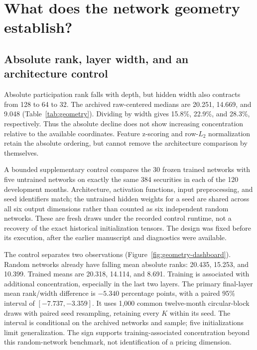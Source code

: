 \section{What does the network geometry establish?}

\subsection{Absolute rank, layer width, and an architecture control}

Absolute participation rank falls with depth, but hidden width also contracts from 128 to 64 to 32. The archived raw-centered medians are 20.251, 14.669, and 9.048 (Table~\ref{tab:geometry}). Dividing by width gives 15.8\%, 22.9\%, and 28.3\%, respectively. Thus the absolute decline does not show increasing concentration relative to the available coordinates. Feature z-scoring and row-$L_2$ normalization retain the absolute ordering, but cannot remove the architecture comparison by themselves.

A bounded supplementary control compares the 30 frozen trained networks with five untrained networks on exactly the same 384 securities in each of the 120 development months. Architecture, activation functions, input preprocessing, and seed identifiers match; the untrained hidden weights for a seed are shared across all six output dimensions rather than counted as six independent random networks. These are fresh draws under the recorded control runtime, not a recovery of the exact historical initialization tensors. The design was fixed before its execution, after the earlier manuscript and diagnostics were available.

The control separates two observations (Figure~\ref{fig:geometry-dashboard}). Random networks already have falling mean absolute ranks: 20.435, 15.253, and 10.399. Trained means are 20.318, 14.114, and 8.691. Training is associated with additional concentration, especially in the last two layers. The primary final-layer mean rank/width difference is $-5.340$ percentage points, with a paired 95\% interval of $[-7.737,-3.359]$. It uses 1,000 common twelve-month circular-block draws with paired seed resampling, retaining every $K$ within its seed. The interval is conditional on the archived networks and sample; five initializations limit generalization. The sign supports training-associated concentration beyond this random-network benchmark, not identification of a pricing dimension.



